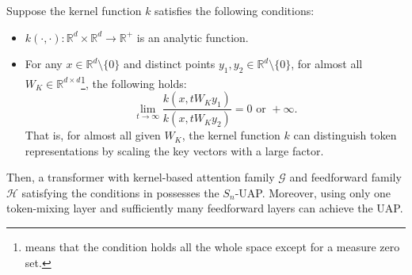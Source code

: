 \documentclass[10pt,a4paper]{amsart}
\begin{document}
\begin{corollary}
    \label{thm:kernel}
    Suppose the kernel function $k$ satisfies the following conditions:
    \begin{itemize}
        \item $k(\cdot,\cdot):\mathbb R^{d}\times \mathbb R^{d}\to \mathbb R^+$ is an analytic function.

        \item For any $x\in\mathbb{R}^d\setminus\{0\}$ and distinct points $y_1, y_2\in\mathbb{R}^d\setminus\{0\}$, for  almost all $W_K\in\mathbb{R}^{d\times d}$\footnote{means that the condition holds all the whole space except for a measure zero set.}, the following holds:
        \begin{equation}
 \lim_{t\to \infty}\frac{k(x, tW_Ky_1)}{k(x, tW_Ky_2)}= 0  \text{ or } +\infty.
        \end{equation}
        That is, for almost all given $W_K$, the kernel function $k$ can distinguish token representations by scaling the key vectors with a large factor.

    \end{itemize}
    Then, a transformer with kernel-based attention family $\mathcal{G}$ and feedforward family $\mathcal{H}$ satisfying the conditions in  possesses the ${S}_n$-UAP. Moreover, using only one token-mixing layer and sufficiently many feedforward layers
    can achieve the UAP.
\end{corollary}
\end{document}
